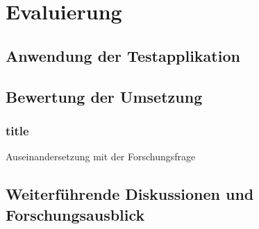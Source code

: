 


 

\chapter{Evaluierung} \label{cha:evaluation}
\section{Anwendung der Testapplikation}
\section{Bewertung der Umsetzung}\label{cha:rating}
\subsection{title}{Auseinandersetzung mit der Forschungsfrage}
\section{Weiterführende Diskussionen und Forschungsausblick}
 